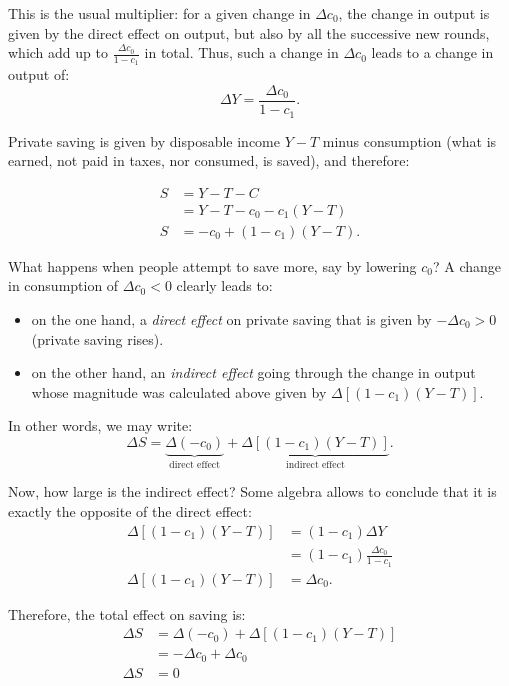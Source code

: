 \documentclass[]{book}
\begin{document}
This is the usual multiplier: for a given change in \(\Delta c_{0}\),
the change in output is given by the direct effect on output, but also
by all the successive new rounds, which add up to
\(\frac{\Delta c_{0}}{1-c_{1}}\) in total. Thus, such a change in
\(\Delta c_{0}\) leads to a change in output of:
\[\Delta Y=\frac{\Delta c_{0}}{1-c_{1}}.\]

Private saving is given by disposable income \(Y-T\) minus consumption
(what is earned, not paid in taxes, nor consumed, is saved), and
therefore:

\[
\begin{aligned}
S &= Y-T-C\\
&= Y-T-c_{0}-c_{1}\left(Y-T\right)\\
S   &= -c_{0}+\left(1-c_{1}\right)\left(Y-T\right).
\end{aligned}
\]

What happens when people attempt to save more, say by lowering
\(c_{0}\)? A change in consumption of \(\Delta c_{0}<0\) clearly leads
to:

\begin{itemize}
\item
  on the one hand, a \emph{direct effect} on private saving that is
  given by \(-\Delta c_{0}>0\) (private saving rises).
\item
  on the other hand, an \emph{indirect effect} going through the change
  in output whose magnitude was calculated above given by
  \(\Delta\left[\left(1-c_{1}\right)\left(Y-T\right)\right]\).
\end{itemize}

In other words, we may write:
\[\Delta S=\underbrace{\Delta(-c_{0})}_{\text{direct effect}}+\underbrace{\Delta\left[\left(1-c_{1}\right)\left(Y-T\right)\right]}_{\text{indirect effect}}.\]

Now, how large is the indirect effect? Some algebra allows to conclude
that it is exactly the opposite of the direct effect: \[\begin{aligned}
\Delta\left[\left(1-c_{1}\right)\left(Y-T\right)\right] &=(1-c_{1})\Delta Y\\
    &=(1-c_{1})\frac{\Delta c_{0}}{1-c_{1}}\\
\Delta\left[\left(1-c_{1}\right)\left(Y-T\right)\right] &=\Delta c_{0}.
\end{aligned}
\]

Therefore, the total effect on saving is: \[\begin{aligned}
\Delta S    &=\Delta(-c_{0})+\Delta\left[\left(1-c_{1}\right)\left(Y-T\right)\right]\\
    &=-\Delta c_{0}+\Delta c_{0}\\
\Delta S    &=0
\end{aligned}
\]
\end{document}
